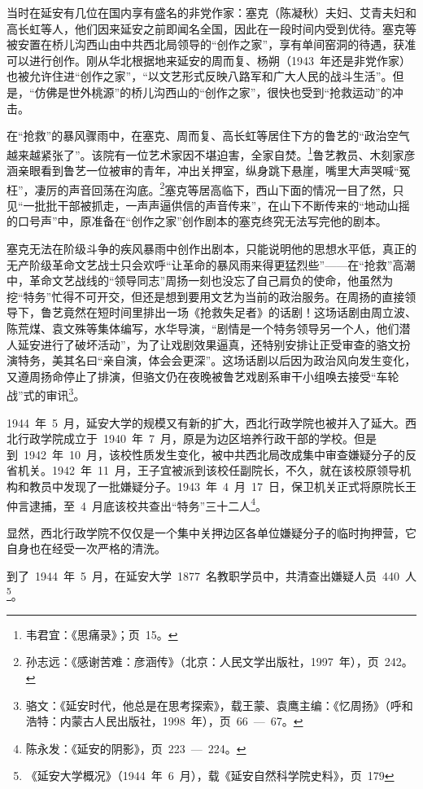 当时在延安有几位在国内享有盛名的非党作家：塞克（陈凝秋）夫妇、艾青夫妇和高长虹等人，他们因来延安之前即闻名全国，因此在一段时间内受到优待。塞克等被安置在桥儿沟西山由中共西北局领导的“创作之家”，享有单间窑洞的待遇，获准可以进行创作。刚从华北根据地来延安的周而复、杨朔（1943~年还是非党作家）也被允许住进“创作之家”，“以文艺形式反映八路军和广大人民的战斗生活”。但是，“仿佛是世外桃源”的桥儿沟西山的“创作之家”，很快也受到“抢救运动”的冲击。

在“抢救”的暴风骤雨中，在塞克、周而复、高长虹等居住下方的鲁艺的“政治空气越来越紧张了”。该院有一位艺术家因不堪迫害，全家自焚。\footnote{韦君宜：《思痛录》；页~15。}鲁艺教员、木刻家彦涵亲眼看到鲁艺一位被审的青年，冲出关押室，纵身跳下悬崖，嘴里大声哭喊“冤枉”，凄厉的声音回荡在沟底。\footnote{孙志远：《感谢苦难：彦涵传》（北京：人民文学出版社，1997~年），页~242。}塞克等居高临下，西山下面的情况一目了然，只见“一批批干部被抓走，一声声逼供信的声音传来”，在山下不断传来的“地动山摇的口号声”中，原准备在“创作之家”创作剧本的塞克终究无法写完他的剧本。

塞克无法在阶级斗争的疾风暴雨中创作出剧本，只能说明他的思想水平低，真正的无产阶级革命文艺战士只会欢呼“让革命的暴风雨来得更猛烈些”——在“抢救”高潮中，革命文艺战线的“领导同志”周扬一刻也没忘了自己肩负的使命，他虽然为挖“特务”忙得不可开交，但还是想到要用文艺为当前的政治服务。在周扬的直接领导下，鲁艺竟然在短时间里排出一场《抢救失足者》的话剧！这场话剧由周立波、陈荒煤、袁文殊等集体编写，水华导演，“剧情是一个特务领导另一个人，他们潜人延安进行了破坏活动”，为了让戏剧效果逼真，还特别安排让正受审查的骆文扮演特务，美其名曰“亲自演，体会会更深”。这场话剧以后因为政治风向发生变化，又遵周扬命停止了排演，但骆文仍在夜晚被鲁艺戏剧系审干小组唤去接受“车轮战”式的审讯\footnote{骆文：《延安时代，他总是在思考探索》，载王蒙、袁鹰主编：《忆周扬》（呼和浩特：内蒙古人民出版社，1998~年），页~66~—~67。}。

1944~年~5~月，延安大学的规模又有新的扩大，西北行政学院也被并入了延大。西北行政学院成立于~1940~年~7~月，原是为边区培养行政干部的学校。但是到~1942~年~10~月，该校性质发生变化，被中共西北局改成集中审查嫌疑分子的反省机关。1942~年~11~月，王子宜被派到该校任副院长，不久，就在该校原领导机构和教员中发现了一批嫌疑分子。1943~年~4~月~17~日，保卫机关正式将原院长王仲言逮捕，至~4~月底该校共查出“特务”三十二人\footnote{陈永发：《延安的阴影》，页~223~—~224。}。

显然，西北行政学院不仅仅是一个集中关押边区各单位嫌疑分子的临时拘押营，它自身也在经受一次严格的清洗。

到了~1944~年~5~月，在延安大学~1877~名教职学员中，共清查出嫌疑人员~440~人\footnote{《延安大学概况》（1944~年~6~月），载《延安自然科学院史料》，页~179}。

